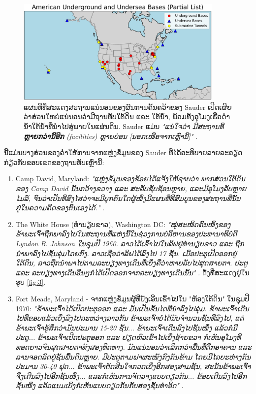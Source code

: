 \documentclass[10pt,twocolumn,letterpaper]{article}
\begin{document}
\begin{figure}[t]
\begin{center}
\includegraphics[width=0.9\textwidth]{basescrop.png}
\end{center}
   \caption{ແຜນທີ່ທີ່ສະແດງສະຖານແນ່ນອນຂອງຜົນການຄົ້ນຄວ້າຂອງ Sauder ເປີດເຜີຍ ວ່າສ່ວນໃຫຍ່ແນ່ນອນວ່າມີຖານທັບໃຕ້ດິນ ແລະ ໃຕ້ນ້ຳ, ພ້ອມທັງອຸໂມງເຮືອດຳນ້ຳໃຕ້ນ້ຳທີ່ນຳໄປສູ່ພາຍໃນແຜ່ນດິນ.
Sauder ແມ່ນ \textit{"ແນ່ໃຈວ່າ ມີສະຖານທີ່ \textbf{ຫຼາຍກວ່ານີ້ອີກ} (facilities) ຫຼາຍບ່ອນ [ນອກເໜືອຈາກເຫຼົ່ານີ້]"} \cite{22}. \cite{116}}
   \label{fig:4}
\end{figure}

ນີ້ແມ່ນບາງສ່ວນຂອງຄຳໃຫ້ການຈາກແຫຼ່ງຂໍ້ມູນຂອງ Sauder ທີ່ໄດ້ອະທິບາຍລາຍລະອຽດກ່ຽວກັບຂອບເຂດຂອງຖານທັບເຫຼົ່ານີ້:

\begin{flushleft}
\begin{enumerate}
    \item Camp David, Maryland: \textit{"ແຫຼ່ງຂໍ້ມູນຂອງຂ້ອຍໄດ້ແຈ້ງໃຫ້ຊາບວ່າ ພາກສ່ວນໃຕ້ດິນຂອງ Camp David ນັ້ນກວ້າງຂວາງ ແລະ ສະລັບຊັບຊ້ອນຫຼາຍ, ແລະມີອຸໂມງລັບຫຼາຍໄມລ໌, ຈົນວ່າເປັນທີ່ສົງໄສວ່າຈະມີບຸກຄົນໃດຜູ້ໜຶ່ງມີແຜນທີ່ທີ່ສົມບູນຂອງສະຖານທີ່ນັ້ນຢູ່ໃນຄວາມຄິດຂອງຕົນເອງໄດ້."} \cite{22}. \cite{117}
    \item The White House (ທຳນຽບຂາວ), Washington DC: \textit{"ໝູ່ສະໜິດຄົນໜຶ່ງຂອງຂ້າພະເຈົ້າຖືກພາລົງໄປໃນສະຖານທີ່ແຫ່ງນີ້ໃນຊ່ວງການບໍລິຫານຂອງປະທານາທິບໍດີ Lyndon B. Johnson ໃນຊຸມປີ 1960. ລາວໄດ້ເຂົ້າໄປໃນລິຟຢູ່ທຳນຽບຂາວ ແລະ ຖືກນຳພາລົງໄປຊັ້ນລຸ່ມໂດຍກົງ. ລາວເຊື່ອວ່າລິຟໄດ້ລົງໄປ 17 ຊັ້ນ. ເມື່ອປະຕູເປີດອອກຢູ່ໃຕ້ດິນ, ລາວຖືກນຳພາໄປຕາມລະບຽງທາງເດິນທີ່ເບິ່ງຄືວ່າຫາຍລັບໄປສຸດສາຍຕາ. ປະຕູ ແລະ ລະບຽງທາງເດີນອື່ນໆກໍໄດ້ເປີດອອກຈາກລະບຽງທາງເດີນນັ້ນ"} \cite{22}. \cite{118}
ດັ່ງທີ່ສະແດງຢູ່ໃນຮູບ \ref{fig:3}.
    \item Fort Meade, Maryland - ຈາກແຫຼ່ງຂໍ້ມູນຜູ້ທີ່ບັງເອີນເຂົ້າໄປໃນ "ຫ້ອງໃຕ້ດິນ" ໃນຊຸມປີ 1970: \textit{"ຂ້າພະເຈົ້າໄດ້ເປີດປະຕູອອກ ແລະ ມັນເປັນຂັ້ນໄດທີ່ນໍາລົງໄປລຸ່ມ. ຂ້າພະເຈົ້າເດີນໄປທີ່ຂອບແລ້ວເບິ່ງລົງໄປລະຫວ່າງລາວກັ້ນ ຂ້າພະເຈົ້າບໍ່ໄດ້ນັບຈຳນວນຊັ້ນທີ່ລົງໄປ, ແຕ່ຂ້າພະເຈົ້າຮູ້ສຶກວ່າມັນປະມານ 15-20 ຊັ້ນ... ຂ້າພະເຈົ້າເດີນລົງໄປຊັ້ນໜຶ່ງ ແລ້ວກໍມີປະຕູ... ຂ້າພະເຈົ້າເປີດປະຕູອອກ ແລະ ຢຽດຫົວເຂົ້າໄປເບິ່ງຊ້າຍຂວາ ກໍເຫັນອຸໂມງທີ່ທອດຍາວຈົນສຸດສາຍຕາທັງສອງທິດທາງ. ມັນແນ່ນອນວ່າເລິກກວ່າພື້ນທີ່ຕຶກອາຄານ ແລະ ລານຈອດລົດຢູ່ຊັ້ນພື້ນດິນຫຼາຍ. ມີປະຕູຕາມຝາຜະໜັງກົງກັນຂ້າມ ໂດຍມີໄລຍະຫ່າງກັນປະມານ 30-40 ຟຸດ... ຂ້າພະເຈົ້າຕັດສິນໃຈກວດເບິ່ງອີກສອງສາມຊັ້ນ, ສະນັ້ນຂ້າພະເຈົ້າຈຶ່ງເດີນລົງໄປອີກຊັ້ນໜຶ່ງ... ແລະກໍເຫັນການຈັດວາງແບບດຽວກັນ... ຂ້ອຍເດີນລົງໄປອີກຊັ້ນໜຶ່ງ ແລ້ວແນມເບິ່ງກໍເຫັນແບບດຽວກັນກັບສອງຊັ້ນທຳອິດ"} \cite{22}. \cite{119}
\end{enumerate}
\end{flushleft}
\end{document}
